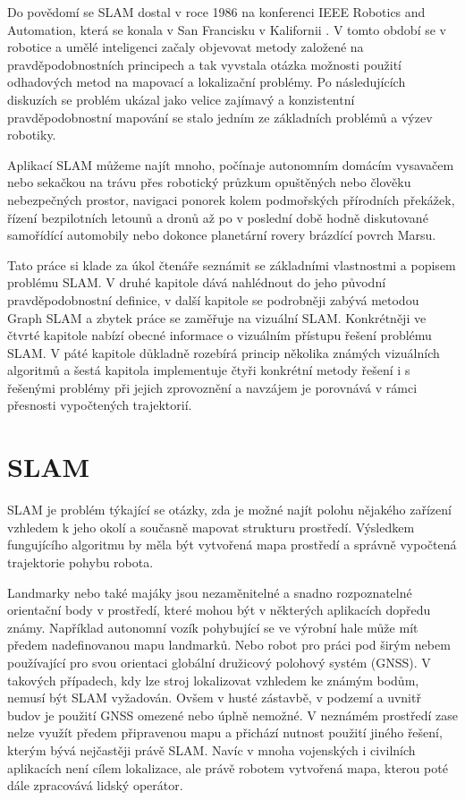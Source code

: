 \documentclass[12pt,a4paper]{report}
\begin{document}
Do povědomí se SLAM dostal v roce 1986 na konferenci IEEE Robotics and Automation, která se konala v San Francisku v Kalifornii \cite{Durrant-Whyte}. V tomto období se v robotice a umělé inteligenci začaly objevovat metody založené na pravděpodobnostních principech a tak vyvstala otázka možnosti použití odhadových metod na mapovací a lokalizační problémy. Po následujících diskuzích se problém ukázal jako velice zajímavý a konzistentní pravděpodobnostní mapování se stalo jedním ze základních problémů a výzev robotiky.

Aplikací SLAM můžeme najít mnoho, počínaje autonomním domácím vysavačem nebo sekačkou na trávu přes robotický průzkum opuštěných nebo člověku nebezpečných prostor, navigaci ponorek kolem podmořských přírodních překážek, řízení bezpilotních letounů a dronů až po v poslední době hodně diskutované samořídící automobily nebo dokonce planetární rovery brázdící povrch Marsu.

Tato práce si klade za úkol čtenáře seznámit se základními vlastnostmi a popisem problému SLAM. V druhé kapitole dává nahlédnout do jeho původní pravděpodobnostní definice, v další kapitole se podrobněji zabývá metodou Graph SLAM a zbytek práce se zaměřuje na vizuální SLAM. Konkrétněji ve čtvrté kapitole nabízí obecné informace o vizuálním přístupu řešení problému SLAM. V páté kapitole důkladně rozebírá princip několika známých vizuálních algoritmů a šestá kapitola implementuje čtyři konkrétní metody řešení i s řešenými problémy při jejich zprovoznění a navzájem je porovnává v rámci přesnosti vypočtených trajektorií. 


\chapter{SLAM}
SLAM je problém týkající se otázky, zda je možné najít polohu nějakého zařízení vzhledem k jeho okolí a současně mapovat strukturu prostředí. Výsledkem fungujícího algoritmu by měla být vytvořená mapa prostředí a správně vypočtená trajektorie pohybu robota.

Landmarky nebo také majáky jsou nezaměnitelné a snadno rozpoznatelné orientační body v prostředí, které mohou být v některých aplikacích dopředu známy. Například autonomní vozík pohybující se ve výrobní hale může mít předem nadefinovanou mapu landmarků. Nebo robot pro práci pod širým nebem používající pro svou orientaci globální družicový polohový systém (GNSS). V takových případech, kdy lze stroj lokalizovat vzhledem ke známým bodům, nemusí být SLAM vyžadován. Ovšem v husté zástavbě, v podzemí a uvnitř budov je použití GNSS omezené nebo úplně nemožné. V neznámém prostředí zase nelze využít předem připravenou mapu a přichází nutnost použití jiného řešení, kterým bývá nejčastěji právě SLAM. Navíc v mnoha vojenských i civilních aplikacích není cílem lokalizace, ale právě robotem vytvořená mapa, kterou poté dále zpracovává lidský operátor.
\end{document}
